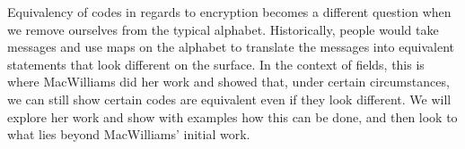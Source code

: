 Equivalency of codes in regards to encryption becomes a different question when we remove ourselves from
the typical alphabet. Historically, people would take messages and use maps on the alphabet to translate
the messages into equivalent statements that look different on the surface. In the context of fields,
this is where MacWilliams did her work and showed that, under certain circumstances, we can still show
certain codes are equivalent even if they look different. We will explore her work and show with
examples how this can be done, and then look to what lies beyond MacWilliams' initial work.